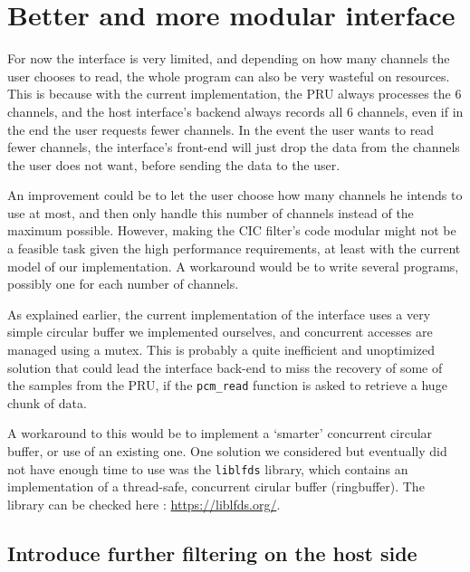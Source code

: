 \documentclass[]{report}
\begin{document}
\hypertarget{better-and-more-modular-interface}{%
\section{Better and more modular
interface}\label{better-and-more-modular-interface}}

For now the interface is very limited, and depending on how many
channels the user chooses to read, the whole program can also be very
wasteful on resources. This is because with the current implementation,
the PRU always processes the 6 channels, and the host interface's
backend always records all 6 channels, even if in the end the user
requests fewer channels. In the event the user wants to read fewer
channels, the interface's front-end will just drop the data from the
channels the user does not want, before sending the data to the user.

An improvement could be to let the user choose how many channels he
intends to use at most, and then only handle this number of channels
instead of the maximum possible. However, making the CIC filter's code
modular might not be a feasible task given the high performance
requirements, at least with the current model of our implementation. A
workaround would be to write several programs, possibly one for each
number of channels.

As explained earlier, the current implementation of the interface uses a
very simple circular buffer we implemented ourselves, and concurrent
accesses are managed using a mutex. This is probably a quite inefficient
and unoptimized solution that could lead the interface back-end to miss
the recovery of some of the samples from the PRU, if the
\texttt{pcm\_read} function is asked to retrieve a huge chunk of data.

A workaround to this would be to implement a `smarter' concurrent
circular buffer, or use of an existing one. One solution we considered
but eventually did not have enough time to use was the \texttt{liblfds}
library, which contains an implementation of a thread-safe, concurrent
cirular buffer (ringbuffer). The library can be checked here :
\url{https://liblfds.org/}.

\hypertarget{introduce-further-filtering-on-the-host-side}{%
\subsection{Introduce further filtering on the host
side}\label{introduce-further-filtering-on-the-host-side}}
\end{document}
